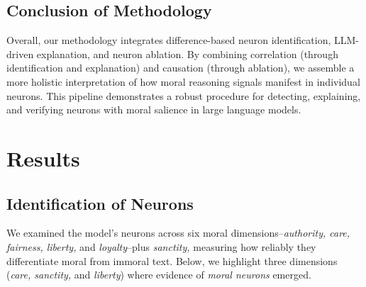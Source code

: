 \documentclass[runninghheads]{llncs}
\begin{document}
\subsection{Conclusion of Methodology}

Overall, our methodology integrates difference-based neuron identification, LLM-driven explanation, and neuron ablation. By combining correlation (through identification and explanation) and causation (through ablation), we assemble a more holistic interpretation of how moral reasoning signals manifest in individual neurons. This pipeline demonstrates a robust procedure for detecting, explaining, and verifying neurons with moral salience in large language models.








\section{Results}
\label{results}


\subsection{Identification of Neurons}


We examined the model’s neurons across six moral dimensions--\textit{authority, care, fairness, liberty,} and \textit{loyalty}--plus \textit{sanctity,} measuring how reliably they differentiate moral from immoral text. Below, we highlight three dimensions (\textit{care, sanctity,} and \textit{liberty}) where evidence of \textit{moral neurons} emerged.
\end{document}
